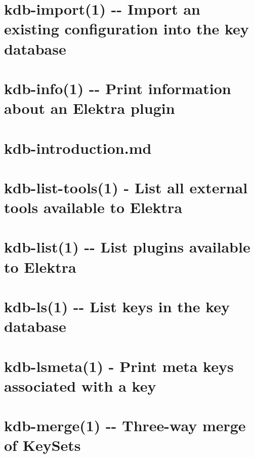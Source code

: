 \documentclass[twoside]{book}
\newcommand{\+}{\discretionary{\mbox{\scriptsize$\hookleftarrow$}}{}{}}
\begin{document}
\chapter{kdb-\/import(1) -\/-\/ Import an existing configuration into the key database}
\label{md_doc_help_kdb-import}
\hypertarget{md_doc_help_kdb-import}{}

\chapter{kdb-\/info(1) -\/-\/ Print information about an Elektra plugin}
\label{md_doc_help_kdb-info}
\hypertarget{md_doc_help_kdb-info}{}

\chapter{kdb-\/introduction.md}
\label{doc_help_kdb-introduction_md}
\hypertarget{doc_help_kdb-introduction_md}{}

\chapter{kdb-\/list-\/tools(1) -\/ List all external tools available to Elektra}
\label{md_doc_help_kdb-list-tools}
\hypertarget{md_doc_help_kdb-list-tools}{}

\chapter{kdb-\/list(1) -\/-\/ List plugins available to Elektra}
\label{md_doc_help_kdb-list}
\hypertarget{md_doc_help_kdb-list}{}

\chapter{kdb-\/ls(1) -\/-\/ List keys in the key database}
\label{md_doc_help_kdb-ls}
\hypertarget{md_doc_help_kdb-ls}{}

\chapter{kdb-\/lsmeta(1) -\/ Print meta keys associated with a key}
\label{md_doc_help_kdb-lsmeta}
\hypertarget{md_doc_help_kdb-lsmeta}{}

\chapter{kdb-\/merge(1) -\/-\/ Three-\/way merge of Key\+Sets}
\label{md_doc_help_kdb-merge}
\hypertarget{md_doc_help_kdb-merge}{}

\end{document}
